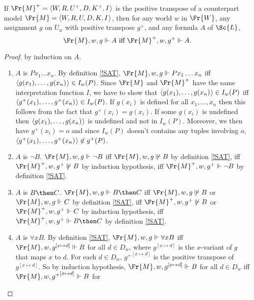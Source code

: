\documentclass[11pt]{woarticle}
\theoremstyle{break}
\theoremstyle{nonumberplain}
\newcommand{\SAT}{\Vdash}
\newcommand{\1}{\;\,|\;\,}
\renewcommand{\t}[1]{\ensuremath{\langle #1  \makebox[.2ex]{}\rangle}}
\begin{document}
\begin{lemma}{\label{transpose}}
  If $\Fr{M}^{+} = \t{W,R,U^{+},D,K^{+},I}$ is the positive transpose of a
  counterpart model $\Fr{M} = \t{W,R,U,D,K,I}$, then for any world $w$ in
  $\Fr{W}$, any assignment $g$ on $U_{w}$ with positive transpose $g^{+}$, and
  any formula $A$ of $\Sc{L}$,
  \[
  \Fr{M},w,g \SAT A \text{ iff } \Fr{M}^{+},w,g^{+} \SAT A.
  \]
\end{lemma}
\begin{proof}
  by induction on $A$.
  \begin{enumerate}
    \item $A$ is $Px_1\ldots x_n$. By definition \ref{!SAT},
          $\Fr{M},w,g \SAT Px_1\ldots x_n$ iff
          $\t{g(x_1),\ldots,g(x_n)} \in I_w(P)$. Since $\Fr{M}$ and $\Fr{M}^{+}$
          have the same interpretation function $I$, we have to show that
          $\t{g(x_1),\ldots,g(x_n)} \in I_w(P)$ iff
          $\t{g^{+}(x_1),\ldots,g^{+}(x_n)} \in I_w(P)$. If $g(x_{i})$ is
          defined for all $x_{1},\ldots, x_{n}$ then this follows from the fact
          that $g^{+}(x_{i}) = g(x_{i})$. If some $g(x_{i})$ is undefined then
          $\t{g(x_1),\ldots,g(x_n)}$ is undefined and not in $I_w(P)$. Moreover,
          we then have $g^+(x_i) = o$ and since $I_{w}(P)$ doesn't contains any
          tuples involving $o$, $\t{g^+(x_1),\ldots,g^+(x_n)} \not\in g^+(P)$.
    \item $A$ is $\neg B$.\; $\Fr{M},w,g \SAT \neg B$ iff
          $\Fr{M},w,g \not\SAT B$ by definition \ref{!SAT}, iff
          $\Fr{M}^{+},w,g^+ \not\SAT B$ by induction hypothesis, iff
          $\Fr{M}^{+},w,g^+ \SAT \neg B$ by definition \ref{!SAT}.
    \item $A$ is $B \then C$.\; $\Fr{M},w,g \SAT B \then C$ iff
          $\Fr{M},w,g \not\SAT B$ or $\Fr{M},w,g \SAT C$ by definition
          \ref{!SAT}, iff $\Fr{M}^{+},w,g^+ \not\SAT B$ or $\Fr{M}^{+},w,g^+ \SAT C$ by
          induction hypothesis, iff $\Fr{M}^{+},w,g^+ \SAT B \then C$ by definition
          \ref{!SAT}.
    \item $A$ is $\forall x B$.\; By definition \ref{!SAT},
          $\Fr{M},w,g \SAT \forall x B$ iff $\Fr{M},w,g^{[x\mapsto d]} \SAT B$
          for all $d \in D_{w}$, where $g^{[x\mapsto d]}$ is the $x$-variant of
          $g$ that maps $x$ to $d$. For each $d \in D_{w}$, ${g^+}^{[x\mapsto d]}$
          is the positive transpose of ${g}^{[x\mapsto d]}$. So by induction hypothesis, $\Fr{M},w,g^{[x\mapsto d]} \SAT B$ for all $d \in D_{w}$ iff $\Fr{M},w,{g^{+}}^{[x\mapsto d]} \SAT B$ for

\end{enumerate}
\end{proof}
\end{document}
